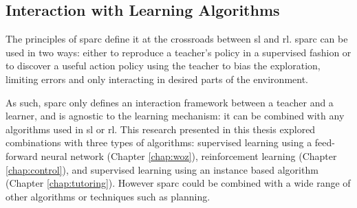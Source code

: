 

\subsection{Interaction with Learning Algorithms}

The principles of \gls{sparc} define it at the crossroads between \gls{sl} and \gls{rl}. \gls{sparc} can be used in two ways: either to reproduce a teacher's policy in a supervised fashion or to discover a useful action policy using the teacher to bias the exploration, limiting errors and only interacting in desired parts of the environment.

As such, \gls{sparc} only defines an interaction framework between a teacher and a learner, and is agnostic to the learning mechanism: it can be combined with any algorithms used in \gls{sl} or \gls{rl}. This research presented in this thesis explored combinations with three types of algorithms: supervised learning using a feed-forward neural network (Chapter \ref{chap:woz}), reinforcement learning (Chapter \ref{chap:control}), and supervised learning using an instance based algorithm (Chapter \ref{chap:tutoring}). However \gls{sparc} could be combined with a wide range of other algorithms or techniques such as planning.


